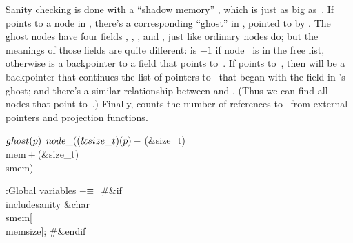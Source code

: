 Sanity checking is done with a ``shadow memory'' , which is
just
as big as~. If  points to a node in , there's a
corresponding
``ghost'' in , pointed to by . The ghost
nodes have four
fields , , , and , just like
ordinary nodes do; but the
meanings of those fields are quite different:  is $-1$ if
node~
is in the free list, otherwise  is a backpointer to a
field
that points to~. If  points to~, then  will be
a backpointer that continues the list of pointers to~ that began
with the  field in 's ghost; and there's a similar
relationship
between  and . (Thus we can find all
nodes that point to~.)
Finally,  counts the number of references to~
from external
pointers and projection functions.

\Y\B\4\D$\\{ghost}(\|p)$ \5
$\\{node\_}((\&{size\_t})(\|p)-{}$(\&{size\_t}) \\{mem}${}+{}$(\&{size\_t}) %
\\{smem})\par
\Y\B\4:Global variables\X${}\mathrel+\equiv{}$\6
\8\#\&{if} \\{includesanity}\6
\&{char} \\{smem}[\\{memsize}];\6
\8\#\&{endif}\par
\fi

